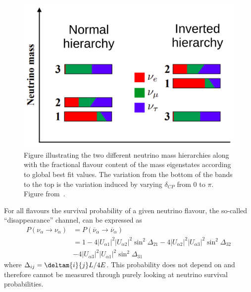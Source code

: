 \begin{figure}[h]
  \centering
  \includegraphics[width=.7\linewidth]{files/figures/theory/mh}
  \caption{Figure illustrating the two different neutrino mass hierarchies along with the fractional flavour content of the mass eigenstates according to global best fit values. The variation from the bottom of the bands to the top is the variation induced by varying $\delta_{CP}$ from 0 to $\pi$. Figure from~\cite{tdrVol2}.}
  \label{fig:massHierarchy}
\end{figure}

For all flavours the survival probability of a given neutrino flavour, the so-called ``disappearance'' channel, can be expressed as~\cite{Nunokawa_2008}
\begin{align}
  P(\nu_{\alpha} \rightarrow \nu_{\alpha}) &= P(\overline{\nu}_{\alpha} \rightarrow \overline{\nu}_{\alpha})\\
  &= 1 - 4|U_{\alpha 1}|^{2} |U_{\alpha 2}|^{2} \sin^{2} \Delta_{21} - 4 |U_{\alpha 2}|^{2} |U_{\alpha 3}|^{2} \sin^{2}\Delta_{32} \\ &- 4 |U_{\alpha 3}|^{2} |U_{\alpha 1}|^{2} \sin^{2} \Delta_{31}
\end{align}
where $\Delta_{ij}=\deltam{i}{j}L/4E$.
This probability does not depend on \dcp and therefore \dcp cannot be measured through purely looking at neutrino survival probabilities.

